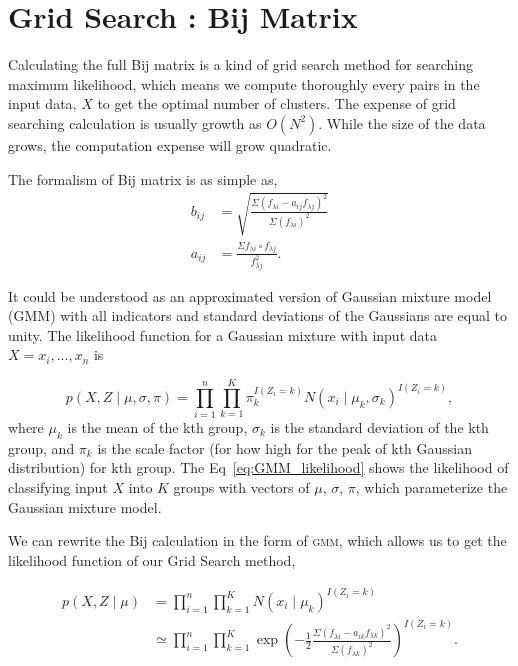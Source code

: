 \documentclass[12pt,letterpaper]{article}
\begin{document}
\section*{Grid Search : Bij Matrix}

Calculating the full Bij matrix is a kind of grid search method 
for searching maximum likelihood, which means we compute thoroughly every pairs in the
input data, $X$ to get the optimal number of clusters.
The expense of grid searching calculation is usually growth as $O(N^2)$.
While the size of the data grows, the computation expense will grow quadratic.

The formalism of Bij matrix is as simple as,
\begin{equation}
    \begin{split}
        b_{ij} &= \sqrt{ \frac{\Sigma ( f_{\lambda i} - a_{ij} f_{\lambda j} )^2}{\Sigma (f_{\lambda i})^2} }\\
        a_{ij} &= \frac{\Sigma f_{\lambda i} \circ f_{\lambda j} }{f_{\lambda j}^2}.
    \end{split}
\end{equation}

It could be understood as an approximated version of Gaussian mixture model (\textsc{GMM})
with all indicators and standard deviations of the Gaussians are equal to unity.
The likelihood function for a Gaussian mixture with 
input data $X = x_i, ..., x_n$ is

\begin{equation}
    p(X, Z \mid \mu, \sigma, \pi) 
    = \prod_{i=1}^{n} \prod_{k=1}^{K} 
    \pi_k^{I(Z_i = k)} N(x_i \mid \mu_k, \sigma_k)^{I(Z_i = k)},
    \label{eq:GMM_likelihood}
\end{equation}
where $\mu_k$ is the mean of the kth group, 
$\sigma_k$ is the standard deviation of the kth group,
and $\pi_k$ is the scale factor 
(for how high for the peak of kth Gaussian distribution)
for kth group.
The Eq~\ref{eq:GMM_likelihood} shows the likelihood of 
classifying input $X$ into $K$ groups with vectors of $\mu$, $\sigma$, $\pi$, 
which parameterize the Gaussian mixture model.

We can rewrite the Bij calculation in the form of \textsc{gmm},
which allows us to get the likelihood function of our Grid Search method,

\begin{equation}
    \begin{split}
        p(X, Z \mid \mu) 
        &= 
        \prod_{i=1}^{n} \prod_{k=1}^{K} 
        N(x_i \mid \mu_k)^{I(Z_i = k)}\\
        &\simeq 
        \prod_{i=1}^{n} \prod_{k=1}^{K} 
        \exp{\left( - \frac{1}{2}  \frac{ \Sigma (f_{\lambda i} - a_{ik} f_{\lambda k} )^2 }{ \Sigma (f_{\lambda k})^2 }  \right)}^{I(Z_i = k)}.
    \end{split}
    \label{eq:GMM_likelihood_Bij}
\end{equation}
\end{document}

